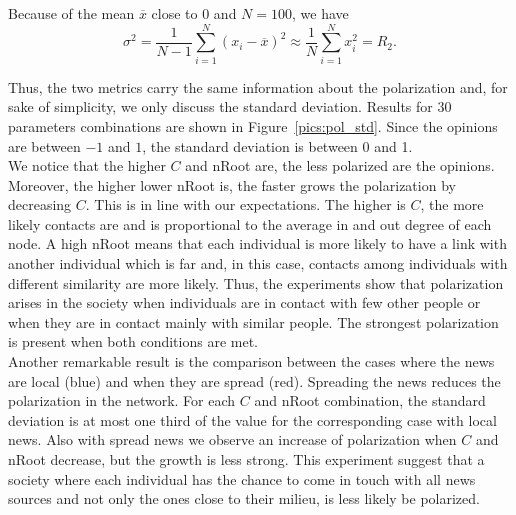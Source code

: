 Because of the mean $\overline{x}$ close to 0 and $N=100$, we have
$$ \sigma^2 = \frac{1}{N-1} \sum_{i=1}^N (x_i-\overline{x})^2 \approx \frac{1}{N} \sum_{i=1}^N x_i^2 = R_2.$$

Thus, the two metrics carry the same information about the polarization and, for sake of simplicity, we only discuss the standard deviation. Results for 30 parameters combinations are shown in Figure~\ref{pics:pol_std}. Since the opinions are between $-1$ and $1$, the standard deviation is between 0 and 1.\\

We notice that the higher $C$ and nRoot are, the less polarized are the opinions. Moreover, the higher lower nRoot is, the faster grows the polarization by decreasing $C$. This is in line with our expectations. The higher is $C$, the more likely contacts are and is proportional to the average in and out degree of each node. A high nRoot means that each individual is more likely to have a link with another individual which is far and, in this case, contacts among individuals with different similarity are more likely. Thus, the experiments show that polarization arises in the society when individuals are in contact with few other people or when they are in contact mainly with similar people. The strongest polarization is present when both conditions are met.\\

Another remarkable result is the comparison between the cases where the news are local (blue) and when they are spread (red). Spreading the news reduces the polarization in the network. 
For each $C$ and nRoot combination, the standard deviation is at most one third of the value for the corresponding case with local news. Also with spread news we observe an increase of polarization when $C$ and nRoot decrease, but the growth is less strong. This experiment suggest that a society where each individual has the chance to come in touch with all news sources and not only the ones close to their milieu, is less likely be polarized.

